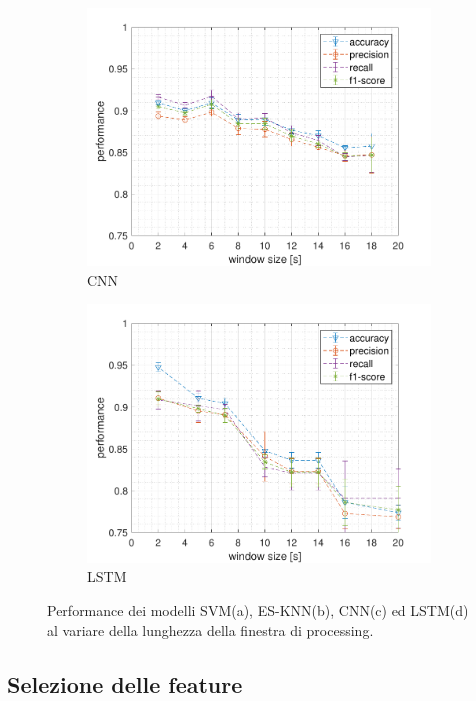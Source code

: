 \begin{figure}[!htb]
\begin{subfigure}{.45\textwidth}
        \includegraphics[width=\textwidth]{figure/cnn_window.pdf}
        \caption{CNN}
        \label{fig:window:cnn}
    \end{subfigure}
    \begin{subfigure}{.45\textwidth}
        \includegraphics[width=\textwidth]{figure/lstm_window.pdf}
        \caption{LSTM}
        \label{fig:window:lstm}
    \end{subfigure}
    \caption{Performance dei modelli SVM(a), ES-KNN(b), CNN(c) ed LSTM(d) al variare della lunghezza della finestra di processing.}
    \label{fig:window}
\end{figure}

\subsection{Selezione delle feature}
\label{ssec:selezione-delle-feature}

